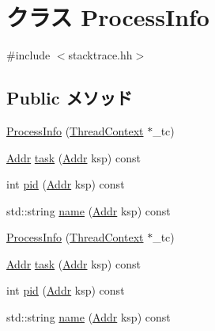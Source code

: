 \hypertarget{classMipsISA_1_1ProcessInfo}{
\section{クラス ProcessInfo}
\label{classMipsISA_1_1ProcessInfo}
}


{\ttfamily \#include $<$stacktrace.hh$>$}\subsection*{Public メソッド}
\begin{DoxyCompactItemize}
\item 
\hyperlink{classMipsISA_1_1ProcessInfo_a9c31978febe8b0cc8e9e76eb6791312b}{ProcessInfo} (\hyperlink{classThreadContext}{ThreadContext} $\ast$\_\-tc)
\item 
\hyperlink{classm5_1_1params_1_1Addr}{Addr} \hyperlink{classMipsISA_1_1ProcessInfo_a05de971c556b8e4418a60289f92dfba3}{task} (\hyperlink{classm5_1_1params_1_1Addr}{Addr} ksp) const 
\item 
int \hyperlink{classMipsISA_1_1ProcessInfo_a27d14b3fdb576a4081e5c58c55375042}{pid} (\hyperlink{classm5_1_1params_1_1Addr}{Addr} ksp) const 
\item 
std::string \hyperlink{classMipsISA_1_1ProcessInfo_ae39ec1168c2ea31862bebf2afeda34d8}{name} (\hyperlink{classm5_1_1params_1_1Addr}{Addr} ksp) const 
\item 
\hyperlink{classMipsISA_1_1ProcessInfo_a9c31978febe8b0cc8e9e76eb6791312b}{ProcessInfo} (\hyperlink{classThreadContext}{ThreadContext} $\ast$\_\-tc)
\item 
\hyperlink{classm5_1_1params_1_1Addr}{Addr} \hyperlink{classMipsISA_1_1ProcessInfo_a05de971c556b8e4418a60289f92dfba3}{task} (\hyperlink{classm5_1_1params_1_1Addr}{Addr} ksp) const 
\item 
int \hyperlink{classMipsISA_1_1ProcessInfo_a27d14b3fdb576a4081e5c58c55375042}{pid} (\hyperlink{classm5_1_1params_1_1Addr}{Addr} ksp) const 
\item 
std::string \hyperlink{classMipsISA_1_1ProcessInfo_a1b2605417c013ef7f6e6416c513f272c}{name} (\hyperlink{classm5_1_1params_1_1Addr}{Addr} ksp) const 
\end{DoxyCompactItemize}
